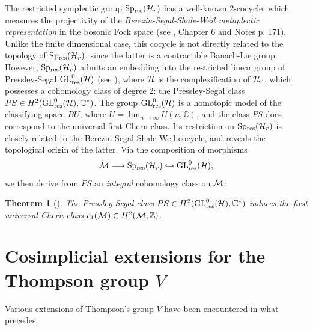 \documentclass[twoside]{irmaems}
\theoremstyle{plain}
\newtheorem{theorem}{Theorem}[section]
\theoremstyle{definition}
\theoremstyle{remark}
\newcommand{\Z}{{\mathbb{Z}}}
\newcommand{\C}{{\mathbb{C}}}
\newcommand{\M}{{{\cal M}}}
\begin{document}
\vspace{0.1cm}\noindent 
 \noindent The restricted symplectic group 
${\rm Sp_{res}}({\cal H}_r)$ has a well-known 
2-cocycle, which measures the 
projectivity of the {\it Berezin-Segal-Shale-Weil metaplectic representation} 
in the bosonic Fock space (see \cite{ne}, Chapter 6 and Notes 
p. 171). Unlike the finite dimensional case, this cocycle is not directly related 
to the topology of ${\rm Sp_{res}}({\cal H}_r)$, 
since the latter is a contractible Banach-Lie group. 
However, ${\rm Sp_{res}}({\cal H}_r)$  admits an embedding into the 
restricted linear group of Pressley-Segal ${\rm {\rm GL}^0_{res}}({\cal H})$ (see 
\cite{pr-se}), where ${\cal 
  H}$ is the complexification of ${\cal H}_r$, which possesses a cohomology class of degree 2: the Pressley-Segal 
class $PS\in H^2({\rm {\rm GL}^0_{res}}({\cal H}),\C^*)$. The group ${\rm {\rm GL}^0_{res}}({\cal H})$ 
is a homotopic model of the classifying space $BU$, where 
$U=\displaystyle{\lim_{n\to \infty} U(n,\C)}$, and the class $PS$ does correspond to the 
universal first Chern class. Its restriction on ${\rm Sp_{res}}({\cal H}_r)$ is 
closely related to the Berezin-Segal-Shale-Weil cocycle, and reveals the topological 
origin of the latter. Via the composition of morphisms 
$$\M\longrightarrow {\rm Sp_{res}}({\cal H}_r) \hookrightarrow 
{\rm {\rm GL}^0_{res}}({\cal 
  H}),$$  we then derive from 
$PS$ an {\it integral} cohomology class on $\M$: 
 
\begin{theorem}[\cite{fu-ka3}]\label{chern} 
The Pressley-Segal class $PS\in H^2({\rm {\rm GL}^0_{res}}({\cal H}),\C^*)$ induces the first universal Chern 
class $c_1(\M)\in H^2({\cal M},\Z)$. 
\end{theorem} 











 
\section{ Cosimplicial extensions for  the Thompson group $V$}
 
Various extensions of Thompson's group $V$ have been encountered in what precedes. 
 
\end{document}
